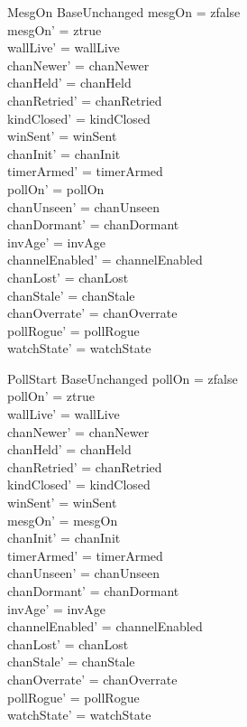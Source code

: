 \documentclass[a4paper,10pt,fleqn]{article}
\begin{document}
\begin{schema}{MesgOn}
  BaseUnchanged
  \where
  mesgOn = zfalse \\
  mesgOn' = ztrue \\
  wallLive' = wallLive \\
  chanNewer' = chanNewer \\
  chanHeld' = chanHeld \\
  chanRetried' = chanRetried \\
  kindClosed' = kindClosed \\
  winSent' = winSent \\
  chanInit' = chanInit \\
  timerArmed' = timerArmed \\
  pollOn' = pollOn \\
  chanUnseen' = chanUnseen \\
  chanDormant' = chanDormant \\
  invAge' = invAge \\
  channelEnabled' = channelEnabled \\
  chanLost' = chanLost \\
  chanStale' = chanStale \\
  chanOverrate' = chanOverrate \\
  pollRogue' = pollRogue \\
  watchState' = watchState
\end{schema}

\begin{schema}{PollStart}
  BaseUnchanged
  \where
  pollOn = zfalse \\
  pollOn' = ztrue \\
  wallLive' = wallLive \\
  chanNewer' = chanNewer \\
  chanHeld' = chanHeld \\
  chanRetried' = chanRetried \\
  kindClosed' = kindClosed \\
  winSent' = winSent \\
  mesgOn' = mesgOn \\
  chanInit' = chanInit \\
  timerArmed' = timerArmed \\
  chanUnseen' = chanUnseen \\
  chanDormant' = chanDormant \\
  invAge' = invAge \\
  channelEnabled' = channelEnabled \\
  chanLost' = chanLost \\
  chanStale' = chanStale \\
  chanOverrate' = chanOverrate \\
  pollRogue' = pollRogue \\
  watchState' = watchState
\end{schema}
\end{document}
